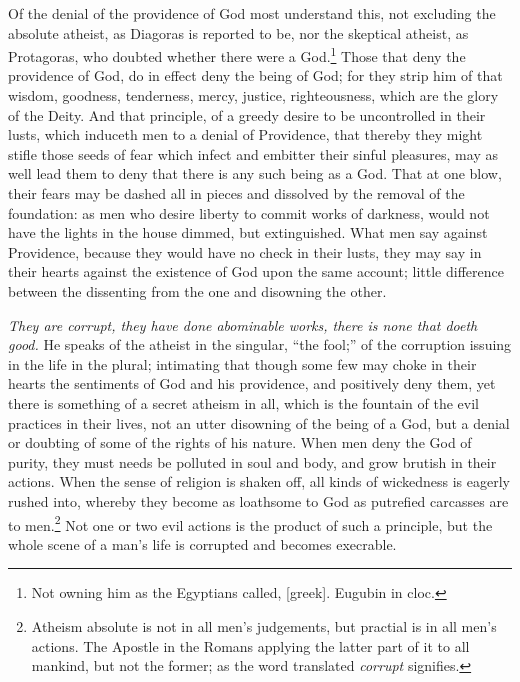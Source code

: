 \documentclass[a5paper]{book}
\newcommand{\grk}{[greek]}
\begin{document}
Of the denial of the providence of God most understand this, 
    not excluding the absolute atheist, as Diagoras is reported to be, 
    nor the skeptical atheist, as Protagoras, 
    who doubted whether there were a God.\footnote{
    Not owning him as the Egyptians called, \grk . Eugubin in cloc.}
Those that deny the providence of God, do in effect deny the being of God; 
    for they strip him of that wisdom, goodness, tenderness,
    mercy, justice, righteousness, which are the glory of the Deity.
And that principle, of a greedy desire to be uncontrolled in their lusts, 
    which induceth men to a denial of Providence, 
    that thereby they might stifle those seeds of fear 
    which infect and embitter their sinful pleasures, 
    may as well lead them to deny that there is any such being as a God. 
That at one blow, their fears may be dashed all in pieces 
    and dissolved by the removal of the foundation:
    as men who desire liberty to commit works of darkness, 
    would not have the lights in the house dimmed, but extinguished. 
What men say against Providence, 
    because they would have no check in their lusts, 
    they may say in their hearts against the existence of God 
    upon the same account; 
    little difference between the dissenting from the one and 
    disowning the other.

\emph{They are corrupt, they have done abominable works, 
    there is none that doeth good.} 
He speaks of the atheist in the singular, ``the fool;'' 
    of the corruption issuing in the life in the plural; 
    intimating that though some few may choke in their hearts 
    the sentiments of God and his providence, and positively deny them, 
    yet there is something of a secret atheism in all, 
    which is the fountain of the evil practices in their lives, 
    not an utter disowning of the being of a God, 
    but a denial or doubting of some of the rights of his nature. 
When men deny the God of purity, 
    they must needs be polluted in soul and body,
    and grow brutish in their actions. 
When the sense of religion is %
    shaken off, 
    all kinds of wickedness is eagerly rushed into, 
    whereby they become as loathsome to God as putrefied carcasses are to men.\footnote{
    Atheism absolute is not in all men's judgements,
    but practial is in all men's actions.
    The Apostle in the Romans applying the latter part of it to all mankind,
    but not the former;
    as the word translated \emph{corrupt} signifies.}
Not one or two evil actions is the product of such a principle, 
    but the whole scene of a man’s life is corrupted and becomes execrable.
\end{document}
